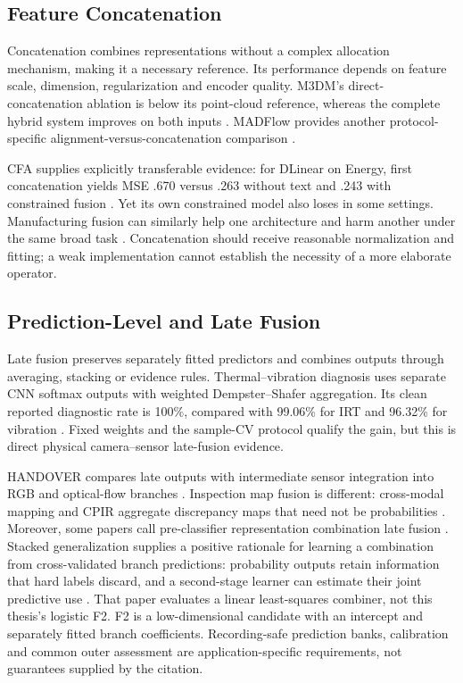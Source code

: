 \subsection{Feature Concatenation}
Concatenation combines representations without a complex allocation mechanism, making it a necessary reference. Its performance depends on feature scale, dimension, regularization and encoder quality. M3DM's direct-concatenation ablation is below its point-cloud reference, whereas the complete hybrid system improves on both inputs \citep[Table~4]{Wang2023Multimodal}. MADFlow provides another protocol-specific alignment-versus-concatenation comparison \citep{Li2025MADFlow}.

CFA supplies explicitly transferable evidence: for DLinear on Energy, first concatenation yields MSE .670 versus .263 without text and .243 with constrained fusion \citep[PDF p.~4, Table~4]{P023}. Yet its own constrained model also loses in some settings. Manufacturing fusion can similarly help one architecture and harm another under the same broad task \citep[Table~3]{Li2022A}. Concatenation should receive reasonable normalization and fitting; a weak implementation cannot establish the necessity of a more elaborate operator.

\subsection{Prediction-Level and Late Fusion}
Late fusion preserves separately fitted predictors and combines outputs through averaging, stacking or evidence rules. Thermal--vibration diagnosis uses separate CNN softmax outputs with weighted Dempster--Shafer aggregation. Its clean reported diagnostic rate is 100\%, compared with 99.06\% for IRT and 96.32\% for vibration \citep[PDF p.~7, Table~VII]{Huo2022Multisensor}. Fixed weights and the sample-CV protocol qualify the gain, but this is direct physical camera--sensor late-fusion evidence.

HANDOVER compares late outputs with intermediate sensor integration into RGB and optical-flow branches \citep[PDF pp.~5--7]{Thoduka2024Handover}. Inspection map fusion is different: cross-modal mapping and CPIR aggregate discrepancy maps that need not be probabilities \citep{Costanzino2024Multimodal,Shangguan2025CPIR}. Moreover, some papers call pre-classifier representation combination late fusion \citep{Wang2020What,Xie2025Audiovisual}. Stacked generalization supplies a positive rationale for learning a combination from cross-validated branch predictions: probability outputs retain information that hard labels discard, and a second-stage learner can estimate their joint predictive use \citep[Sections~2--3]{Ting1999Issues}. That paper evaluates a linear least-squares combiner, not this thesis's logistic F2. F2 is a low-dimensional candidate with an intercept and separately fitted branch coefficients. Recording-safe prediction banks, calibration and common outer assessment are application-specific requirements, not guarantees supplied by the citation.

